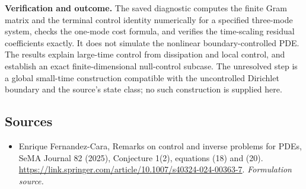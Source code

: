 \documentclass[11pt]{article}
\begin{document}
\textbf{Verification and outcome.}
The saved diagnostic computes the finite Gram matrix and the terminal control
identity numerically for a specified three-mode system, checks the one-mode
cost formula, and verifies the time-scaling residual coefficients exactly.
It does not simulate the nonlinear boundary-controlled PDE.  The results
explain large-time control from dissipation and local control, and establish
an exact finite-dimensional null-control subcase.  The unresolved step is a
global small-time construction compatible with the uncontrolled Dirichlet
boundary and the source's state class; no such construction is supplied here.
\subsection{Sources}
\begin{itemize}
\item[S1]Enrique Fernandez-Cara, Remarks on control and inverse problems for PDEs, SeMA Journal 82 (2025), Conjecture 1(2), equations (18) and (20).
\url{https://link.springer.com/article/10.1007/s40324-024-00363-7}.
\textit{Formulation source.}
\end{itemize}
\end{document}
